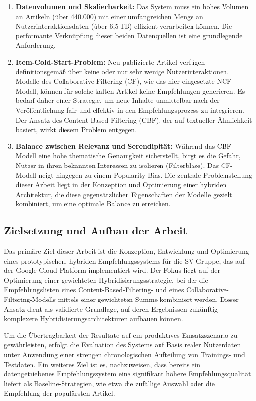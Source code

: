 \begin{enumerate}
    \item \textbf{Datenvolumen und Skalierbarkeit:} Das System muss ein hohes Volumen an Artikeln (über 440.000) mit einer umfangreichen Menge an Nutzerinteraktionsdaten (über 6,5\,TB) effizient verarbeiten können. Die performante Verknüpfung dieser beiden Datenquellen ist eine grundlegende Anforderung.
    
    \item \textbf{Item-Cold-Start-Problem:} Neu publizierte Artikel verfügen definitionsgemäß über keine oder nur sehr wenige Nutzerinteraktionen. Modelle des Collaborative Filtering (CF), wie das hier eingesetzte NCF-Modell, können für solche kalten Artikel keine Empfehlungen generieren. Es bedarf daher einer Strategie, um neue Inhalte unmittelbar nach der Veröffentlichung fair und effektiv in den Empfehlungsprozess zu integrieren. Der Ansatz des Content-Based Filtering (CBF), der auf textueller Ähnlichkeit basiert, wirkt diesem Problem entgegen.
    
    \item \textbf{Balance zwischen Relevanz und Serendipität:} Während das CBF-Modell eine hohe thematische Genauigkeit sicherstellt, birgt es die Gefahr, Nutzer in ihren bekannten Interessen zu isolieren (Filterblase). Das CF-Modell neigt hingegen zu einem Popularity Bias. Die zentrale Problemstellung dieser Arbeit liegt in der Konzeption und Optimierung einer hybriden Architektur, die diese gegensätzlichen Eigenschaften der Modelle gezielt kombiniert, um eine optimale Balance zu erreichen.
\end{enumerate}

\subsection{Zielsetzung und Aufbau der Arbeit}
\label{sec:zielsetzung}
Das primäre Ziel dieser Arbeit ist die Konzeption, Entwicklung und Optimierung eines prototypischen, 
hybriden Empfehlungssystems für die SV-Gruppe, das auf der Google Cloud Platform implementiert wird. 
Der Fokus liegt auf der Optimierung einer gewichteten Hybridisierungsstrategie, bei der die Empfehlungslisten 
eines Content-Based-Filtering- und eines Collaborative-Filtering-Modells mittels einer gewichteten Summe 
kombiniert werden. Dieser Ansatz dient als validierte Grundlage, auf deren Ergebnissen zukünftig komplexere 
Hybridisierungsarchitekturen aufbauen können.

Um die Übertragbarkeit der Resultate auf ein produktives Einsatzszenario zu gewährleisten, 
erfolgt die Evaluation des Systems auf Basis realer Nutzerdaten unter Anwendung einer strengen 
chronologischen Aufteilung von Trainings- und Testdaten. Ein weiteres Ziel ist es, nachzuweisen, 
dass bereits ein datengetriebenes Empfehlungssystem eine signifikant höhere Empfehlungsqualität liefert 
als Baseline-Strategien, wie etwa die zufällige Auswahl oder die Empfehlung der populärsten Artikel.

